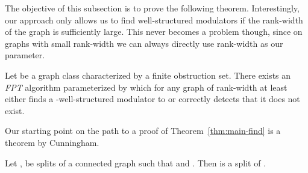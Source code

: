 \documentclass{llncs}
\def\wsm{well-structured modulator}
\begin{document}
The objective of this subsection is to prove the following theorem. Interestingly, our approach only allows us to find \wsm s if the rank-width of the graph is sufficiently large. This never becomes a problem though, since on graphs with small rank-width we can always directly use rank-width as our parameter.\sv{\enlargethispage*{8mm}}

\begin{theorem}
\label{thm:main-find}
Let  be a graph class characterized by a finite obstruction set. There exists an \emph{FPT} algorithm parameterized by  which for any graph  of rank-width at least  either finds a -{\wsm} to  or correctly detects that it does not exist. 
\end{theorem}

{Our starting point on the path to a proof of Theorem~\ref{thm:main-find} is a theorem by Cunningham.}

\begin{theorem}\label{thm:splitintersection}
Let ,  be splits of a connected graph  such that   and
. Then  is a split of .
\end{theorem}
\end{document}
